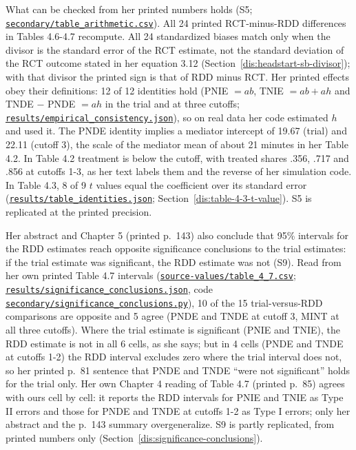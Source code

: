What can be checked from her printed numbers holds (S5; \href{https://github.com/alectionary/vibe-math/blob/master/formalization/chen-rdd-mediation/secondary/table_arithmetic.csv}{\nolinkurl{secondary/table_arithmetic.csv}}). All 24 printed RCT-minus-RDD differences in Tables 4.6-4.7 recompute. All 24 standardized biases match only when the divisor is the standard error of the RCT estimate, not the standard deviation of the RCT outcome stated in her equation 3.12 (Section~\ref{dis:headstart-sb-divisor}); with that divisor the printed sign is that of RDD minus RCT. Her printed effects obey their definitions: 12 of 12 identities hold (PNIE $= ab$, TNIE $= ab + ah$ and TNDE $-$ PNDE $= ah$ in the trial and at three cutoffs; \href{https://github.com/alectionary/vibe-math/blob/master/formalization/chen-rdd-mediation/results/empirical_consistency.json}{\nolinkurl{results/empirical_consistency.json}}), so on real data her code estimated $h$ and used it. The PNDE identity implies a mediator intercept of 19.67 (trial) and 22.11 (cutoff 3), the scale of the mediator mean of about 21 minutes in her Table 4.2. In Table 4.2 treatment is below the cutoff, with treated shares .356, .717 and .856 at cutoffs 1-3, as her text labels them and the reverse of her simulation code. In Table 4.3, 8 of 9 $t$ values equal the coefficient over its standard error (\href{https://github.com/alectionary/vibe-math/blob/master/formalization/chen-rdd-mediation/results/table_identities.json}{\nolinkurl{results/table_identities.json}}; Section~\ref{dis:table-4-3-t-value}). S5 is replicated at the printed precision.

Her abstract and Chapter 5 (printed p.~143) also conclude that 95\% intervals for the RDD estimates reach opposite significance conclusions to the trial estimates: if the trial estimate was significant, the RDD estimate was not (S9). Read from her own printed Table 4.7 intervals (\href{https://github.com/alectionary/vibe-math/blob/master/formalization/chen-rdd-mediation/source-values/table_4_7.csv}{\nolinkurl{source-values/table_4_7.csv}}; \href{https://github.com/alectionary/vibe-math/blob/master/formalization/chen-rdd-mediation/results/significance_conclusions.json}{\nolinkurl{results/significance_conclusions.json}}, code \href{https://github.com/alectionary/vibe-math/blob/master/formalization/chen-rdd-mediation/secondary/significance_conclusions.py}{\nolinkurl{secondary/significance_conclusions.py}}), 10 of the 15 trial-versus-RDD comparisons are opposite and 5 agree (PNDE and TNDE at cutoff 3, MINT at all three cutoffs). Where the trial estimate is significant (PNIE and TNIE), the RDD estimate is not in all 6 cells, as she says; but in 4 cells (PNDE and TNDE at cutoffs 1-2) the RDD interval excludes zero where the trial interval does not, so her printed p.~81 sentence that PNDE and TNDE ``were not significant'' holds for the trial only. Her own Chapter 4 reading of Table 4.7 (printed p.~85) agrees with ours cell by cell: it reports the RDD intervals for PNIE and TNIE as Type II errors and those for PNDE and TNDE at cutoffs 1-2 as Type I errors; only her abstract and the p.~143 summary overgeneralize. S9 is partly replicated, from printed numbers only (Section~\ref{dis:significance-conclusions}).

